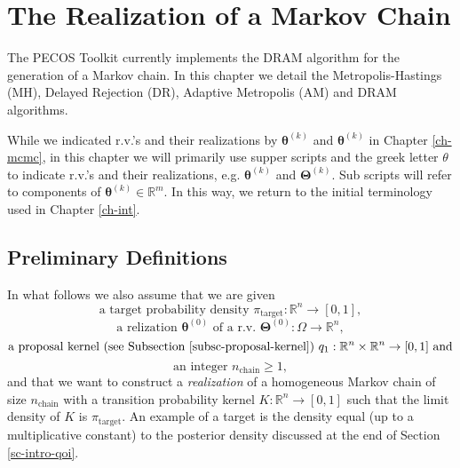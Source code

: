 \chapter{The Realization of a Markov Chain}\label{ch-rmc}
\thispagestyle{headings}

The PECOS Toolkit currently implements the DRAM algorithm \cite{HaLaMiSa06} for the generation of a Markov chain.
In this chapter we detail the
Metropolis-Hastings (MH),
Delayed Rejection (DR),
Adaptive Metropolis (AM) and
DRAM algorithms.

While we indicated r.v.'s and their realizations by $\boldsymbol{\theta}^{(k)}$ and $\boldsymbol{\theta}^{(k)}$ in Chapter \ref{ch-mcmc},
in this chapter we will primarily use supper scripts and the greek letter $\theta$ to indicate r.v.'s and their realizations, e.g. $\boldsymbol{\theta}^{(k)}$ and $\boldsymbol{\Theta}^{(k)}$.
Sub scripts will refer to components of $\boldsymbol{\theta}^{(k)}\in\mathbb{R}^m$. In this way, we return to the initial terminology used in Chapter \ref{ch-int}.

\section{Preliminary Definitions}

In what follows we also assume that
we are given
\begin{equation}\label{eq-pi-target}
\text{a target probability density }\pi_{\text{target}}:\mathbb{R}^n\rightarrow [0,1],
\end{equation}
\begin{equation}\label{eq-y0}
\text{a relization }\boldsymbol{\theta}^{(0)}\text{ of a r.v. }\boldsymbol{\Theta}^{(0)}:\Omega\rightarrow\mathbb{R}^n,
\end{equation}
\begin{equation}\label{eq-q1}
\text{a proposal kernel (see Subsection \ref{subsc-proposal-kernel}) }q_1:\mathbb{R}^n\times \mathbb{R}^n\rightarrow [0,1]\text{ and}
\end{equation}
\begin{equation}\label{eq-n-chain}
\text{an integer }n_{\text{chain}}\geqslant 1,
\end{equation}
and that
we want to construct a {\it realization} of
a homogeneous Markov chain of size $n_{\text{chain}}$ with a transition probability kernel $K:\mathbb{R}^n\rightarrow [0,1]$
such that the limit density of $K$ is $\pi_{\text{target}}$.
An example of a target is the density equal (up to a multiplicative constant) to the posterior density discussed
at the end of Section \ref{sc-intro-qoi}.


